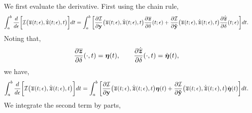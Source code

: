 \documentclass[3p,computermodern,10pt]{elsarticle}
\begin{document}
\begin{appendices}
We first evaluate the derivative. First using the chain rule,
$$ \int_a^b \frac{d}{d\epsilon}\bigg[ \mathcal{I} \big(\overline{\boldsymbol z}(t;\epsilon),\dot{\overline{\boldsymbol z}}(t;\epsilon) ,t\big) \bigg] dt = \int_a^b \bigg[ \frac{\partial \mathcal{I}  }{\partial \mathbf{y} } \big(\overline{\boldsymbol z}(t;\epsilon),\dot{\overline{\boldsymbol z}}(t;\epsilon) ,t\big) \frac{\partial \overline{\boldsymbol z} }{\partial \delta}(t;\epsilon)  + \frac{\partial \mathcal{I}}{\partial \mathbf{\dot{y}} } \big(\overline{\boldsymbol z}(t;\epsilon),\dot{\overline{\boldsymbol z}}(t;\epsilon) ,t \big) \frac{\partial \dot{\overline{\boldsymbol z}}}{\partial \delta} (t;\epsilon)\bigg]dt . $$
Noting that,
$$\frac{\partial \overline{\boldsymbol z}}{\partial \delta} (\cdot,t)= \boldsymbol \eta(t), \qquad \frac{\partial \dot{\overline{\boldsymbol z}} }{\partial \delta}(\cdot,t)= \dot{\boldsymbol \eta}(t),$$
we have,
$$\int_a^b \frac{d}{d\epsilon}\bigg[ \mathcal{I} \big(\overline{\boldsymbol z}(t;\epsilon),\dot{\overline{\boldsymbol z}}(t;\epsilon) ,t \big) \bigg] dt = \int_a^b \bigg[ \frac{\partial \mathcal{I}  }{\partial \mathbf{y} } \big(\overline{\boldsymbol z}(t;\epsilon),\dot{\overline{\boldsymbol z}}(t;\epsilon),t \big) \boldsymbol \eta(t)  + \frac{\partial \mathcal{I}}{\partial \mathbf{\dot{y}} } \big(\overline{\boldsymbol z}(t;\epsilon),\dot{\overline{\boldsymbol z}}(t;\epsilon) ,t \big) \dot{\boldsymbol \eta}(t) \bigg]dt. $$
We integrate the second term by parts,
\begin{multline*}

\end{multline*}
\end{appendices}
\end{document}
